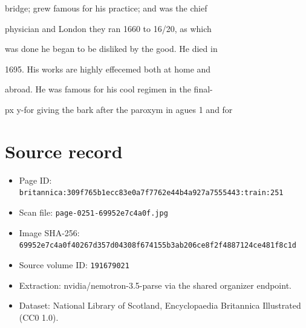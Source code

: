 \documentclass{article}
\begin{document}
bridge; grew famous for his practice; and was the chief

physician and London they ran 1660 to 16/20, as which

was done he began to be disliked by the good. He died in

1695. His works are highly effecemed both at home and

abroad. He was famous for his cool regimen in the final-

px y-for giving the bark after the paroxym in agues 1 and for

\section*{Source record}
\begin{itemize}
\item Page ID: \texttt{britannica:309f765b1ecc83e0a7f7762e44b4a927a7555443:train:251}
\item Scan file: \texttt{page-0251-69952e7c4a0f.jpg}
\item Image SHA-256: \texttt{69952e7c4a0f40267d357d04308f674155b3ab206ce8f2f4887124ce481f8c1d}
\item Source volume ID: \texttt{191679021}
\item Extraction: nvidia/nemotron-3.5-parse via the shared organizer endpoint.
\item Dataset: National Library of Scotland, Encyclopaedia Britannica Illustrated (CC0 1.0).
\end{itemize}
\end{document}
